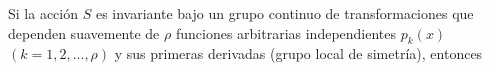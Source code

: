 \documentclass[preview]{standalone}
\begin{document}
\begin{justify}
Si la acción $S$ es invariante bajo un grupo continuo de transformaciones que dependen suavemente de $\rho$ funciones arbitrarias independientes $p_k(x)$ $(k=1,2,...,\rho)$ y sus primeras derivadas (grupo local de simetría), entonces
\end{justify}
\end{document}
